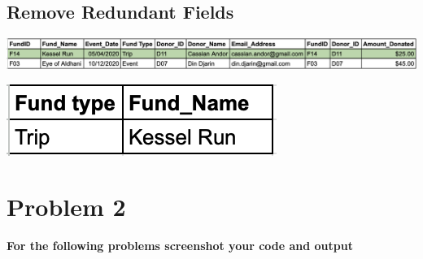 \documentclass{article}
\begin{document}
\subsection*{Remove Redundant Fields}

\begin{center}
    \includegraphics*[scale=.39]{./answer_filter.png}
\end{center}

\begin{center}
    \includegraphics*[scale=.5]{./answer.png}
\end{center}


\section*{Problem 2}

\textbf{For the following problems screenshot your code and output}
\end{document}
